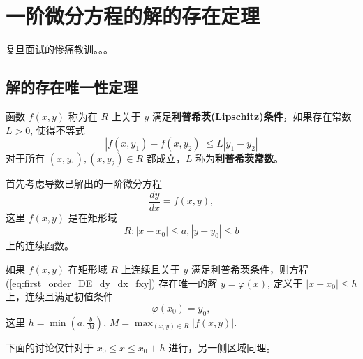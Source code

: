 \chapter{一阶微分方程的解的存在定理}\label{chap:一阶微分方程的解的存在唯一性定理}
复旦面试的惨痛教训。。。
\section{解的存在唯一性定理}
\begin{definition}[Lipschitz条件]\label{def:Lipschitz条件}
    函数 $f(x,y)$ 称为在 $R$ 上关于 $y$ 满足\textbf{利普希茨(Lipschitz)条件}，如果存在常数 $L>0$,
使得不等式
$$|f(x,y_1)-f(x,y_2)| \le L|y_1-y_2|$$
对于所有 $(x,y_1), (x,y_2) \in R$ 都成立，$L$ 称为\textbf{利普希茨常数}。
\end{definition}
首先考虑导数已解出的一阶微分方程
\begin{equation}
\frac{dy}{dx} = f(x,y), \label{eq:first_order_DE_dy_dx_fxy}
\end{equation}
这里 $f(x,y)$ 是在矩形域
\begin{equation}
R: |x-x_0| \le a, |y-y_0| \le b \label{eq:rectangular_domain}
\end{equation}
上的连续函数。
\begin{theorem}[Picard定理]\label{thm:existence_uniqueness}
    如果 $f(x,y)$ 在矩形域 $R$ 上连续且关于 $y$ 满足利普希茨条件，则方程 (\ref{eq:first_order_DE_dy_dx_fxy})
存在唯一的解 $y=\varphi(x)$, 定义于 $|x-x_0| \le h$ 上，连续且满足初值条件
\begin{equation}
\varphi(x_0)=y_0, \label{eq:initial_condition}
\end{equation}
这里 $h=\min\left(a, \frac{b}{M}\right)$, $M= \max_{(x,y) \in R} |f(x,y)|$.
\end{theorem}

下面的讨论仅针对于 $x_0\le x \le x_0+h$ 进行，另一侧区域同理。

